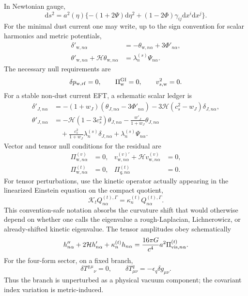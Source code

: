 \documentclass[
  aps,
  prd,
  reprint,
  superscriptaddress,
  floatfix,
  nofootinbib,
  longbibliography
]{revtex4-2}
\theoremstyle{plain}
\theoremstyle{definition}
\theoremstyle{remark}
\newcommand{\dd}{\mathrm d}
\newcommand{\wind}{\mathrm w}
\newcommand{\GI}{\mathrm{GI}}
\newcommand{\eps}{\epsilon}
\begin{document}
In Newtonian gauge,
\begin{equation}
\dd s^2=a^2(\eta)\{-(1+2\Psi)\dd\eta^2
+(1-2\Phi)\gamma_{ij}\dd x^i\dd x^j\} .
\end{equation}
For the minimal dust current one may write, up to the sign convention for
scalar harmonics and metric potentials,
\begin{align}
\delta'_{\wind,n\alpha}&=-\theta_{\wind,n\alpha}
+3\Phi'_{n\alpha},\\
\theta'_{\wind,n\alpha}+\mathcal H\theta_{\wind,n\alpha}
&=\lambda_n^{(s)}\Psi_{n\alpha} .
\end{align}
The necessary null requirements are
\begin{equation}
\delta p_{\wind,{\rm rf}}=0,
\qquad
\Pi_\wind^{\GI}=0,
\qquad
v_{s,\wind}^2=0 .
\label{eq:pert_null_tests_v16}
\end{equation}
For a stable non-dust current EFT, a schematic scalar ledger is
\begin{align}
\delta'_{J,n\alpha}
&=-(1+w_J)(\theta_{J,n\alpha}-3\Phi'_{n\alpha})
-3\mathcal H(c_s^2-w_J)\delta_{J,n\alpha},\\
\theta'_{J,n\alpha}
&=-\mathcal H(1-3c_s^2)\theta_{J,n\alpha}
-\frac{w'_J}{1+w_J}\theta_{J,n\alpha}\\
&\quad+\frac{c_s^2}{1+w_J}\lambda_n^{(s)}\delta_{J,n\alpha}
+\lambda_n^{(s)}\Psi_{n\alpha} .
\end{align}
Vector and tensor null conditions for the residual are
\begin{align}
\Pi^{(v)}_{\wind,n\alpha}&=0,&
 v^{(v)\prime}_{\wind,n\alpha}+\mathcal H v^{(v)}_{\wind,n\alpha}&=0,\\
\Pi^{(t)}_{\wind,n\alpha}&=0,&
\Pi^{(t)}_{q,n\alpha}&=0 .
\end{align}
For tensor perturbations, use the kinetic operator actually appearing in the
linearized Einstein equation on the compact quotient,
\begin{equation}
\mathcal K_t Q^{(t),\Gamma}_{n\alpha}
=\kappa^{(t)}_n Q^{(t),\Gamma}_{n\alpha} .
\end{equation}
This convention-safe notation absorbs the curvature shift that would otherwise
depend on whether one calls the eigenvalue a rough-Laplacian, Lichnerowicz, or
already-shifted kinetic eigenvalue.  The tensor amplitudes obey schematically
\begin{equation}
h''_{n\alpha}+2\mathcal Hh'_{n\alpha}
+\kappa^{(t)}_n h_{n\alpha}
=\frac{16\pi G}{c^4}a^2\Pi^{(t)}_{{\rm vis},n\alpha} .
\end{equation}
For the four-form sector, on a fixed branch,
\begin{equation}
\delta T^{q\,\mu}{}_{\nu}=0,
\qquad
\delta T^q_{\mu\nu}=-\eps_q\delta g_{\mu\nu} .
\end{equation}
Thus the branch is unperturbed as a physical vacuum component; the covariant
index variation is metric-induced.
\end{document}
